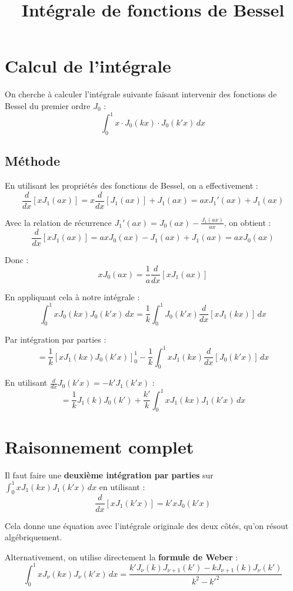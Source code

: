 \documentclass[a4paper,11pt]{article}
\title{Intégrale de fonctions de Bessel}
\author{}
\date{}
\begin{document}
\maketitle

\section*{Calcul de l'intégrale}

On cherche à calculer l'intégrale suivante faisant intervenir des fonctions de Bessel du premier ordre $J_0$ :
\[
\int_0^1 x \cdot J_0(kx) \cdot J_0(k'x) \, dx
\]

\subsection*{Méthode}

En utilisant les propriétés des fonctions de Bessel, on a effectivement :
\[
\frac{d}{dx}[x J_1(ax)] = x \frac{d}{dx}[J_1(ax)] + J_1(ax) = ax J_1'(ax) + J_1(ax)
\]

Avec la relation de récurrence $J_1'(ax) = J_0(ax) - \frac{J_1(ax)}{ax}$, on obtient :
\[
\frac{d}{dx}[x J_1(ax)] = ax J_0(ax) - J_1(ax) + J_1(ax) = ax J_0(ax)
\]

Donc :
\[
x J_0(ax) = \frac{1}{a} \frac{d}{dx}[x J_1(ax)]
\]

En appliquant cela à notre intégrale :
\[
\int_0^1 x J_0(kx) J_0(k'x) \, dx = \frac{1}{k} \int_0^1 J_0(k'x) \frac{d}{dx}[x J_1(kx)] \, dx
\]

Par intégration par parties :
\[
= \frac{1}{k} \left[ x J_1(kx) J_0(k'x) \right]_0^1 - \frac{1}{k} \int_0^1 x J_1(kx) \frac{d}{dx}[J_0(k'x)] \, dx
\]

En utilisant $\frac{d}{dx}J_0(k'x) = -k' J_1(k'x)$ :
\[
= \frac{1}{k} J_1(k) J_0(k') + \frac{k'}{k} \int_0^1 x J_1(kx) J_1(k'x) \, dx
\]

\section*{Raisonnement complet}

Il faut faire une \textbf{deuxième intégration par parties} sur $\int_0^1 x J_1(kx) J_1(k'x) \, dx$ en utilisant :
\[
\frac{d}{dx}[x J_1(k'x)] = k'x J_0(k'x)
\]

Cela donne une équation avec l'intégrale originale des deux côtés, qu'on résout algébriquement.

Alternativement, on utilise directement la \textbf{formule de Weber} :
\[
\boxed{\int_0^1 x J_\nu(kx) J_\nu(k'x) \, dx = \frac{k' J_\nu(k) J_{\nu+1}(k') - k J_{\nu+1}(k) J_\nu(k')}{k^2 - k'^2}}
\]
\end{document}
